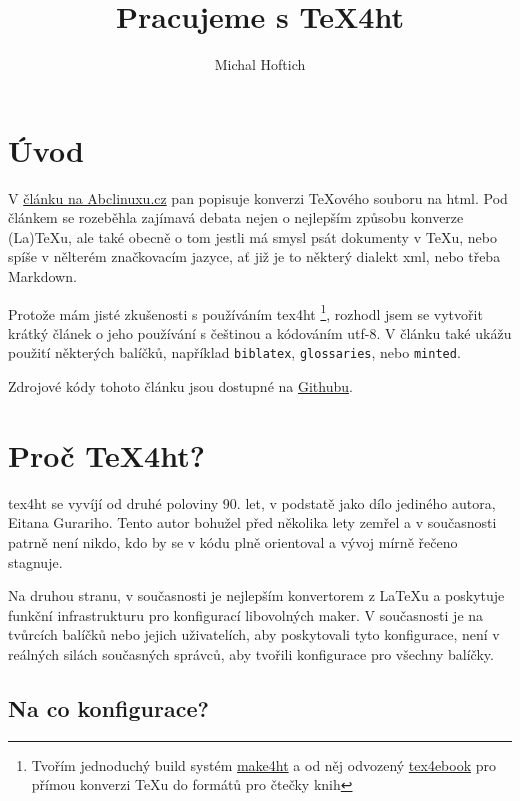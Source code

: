 \documentclass{article}
\begin{document}
\title{Pracujeme s TeX4ht}
\author{Michal Hoftich}
\maketitle
\tableofcontents
\section{Úvod}
V \href{http://www.abclinuxu.cz/clanky/tex-5-priklad-makra-pro-generovani-html}{článku na Abclinuxu.cz} 
pan \textcite{Olsak13}  popisuje konverzi \TeX ového souboru na html. 
Pod článkem se rozeběhla zajímavá debata nejen o nejlepším způsobu konverze
(La)\TeX u, ale také obecně o tom jestli má smysl psát dokumenty v \TeX u, nebo spíše v nělterém značkovacím jazyce, ať již je to některý dialekt xml, nebo třeba Markdown.

Protože mám jisté zkušenosti s používáním \gls{tex4ht}%
\footnote{Tvořím jednoduchý build systém \href{https://github.com/michal-h21/make4ht}{make4ht} 
a od něj odvozený \href{https://github.com/michal-h21/tex4ebook}{tex4ebook} 
pro přímou konverzi \TeX u do formátů pro čtečky knih},
rozhodl jsem se vytvořit krátký článek o jeho používání s češtinou a kódováním utf-8. V článku také ukážu použití některých balíčků, například \verb|biblatex|,
\verb|glossaries|, nebo \verb|minted|.

Zdrojové kódy tohoto článku jsou dostupné na \href{https://github.com/michal-h21/abcclanek}{Githubu}.

\section{Proč TeX4ht?}

\gls{tex4ht} se vyvíjí od druhé poloviny 90. let, v podstatě jako dílo 
jediného autora, Eitana Gurariho. Tento autor bohužel před několika lety zemřel
a v současnosti patrně není nikdo, kdo by se v kódu plně orientoval 
a vývoj mírně řečeno stagnuje. 

Na druhou stranu, v současnosti je nejlepším konvertorem z 
\LaTeX u a poskytuje funkční infrastrukturu pro konfigurací libovolných maker. 
V současnosti je na tvůrcích balíčků nebo jejich uživatelích, aby poskytovali 
tyto konfigurace, není v reálných silách současných správců, aby tvořili konfigurace pro všechny balíčky.

\subsection{Na co konfigurace?}
\end{document}
